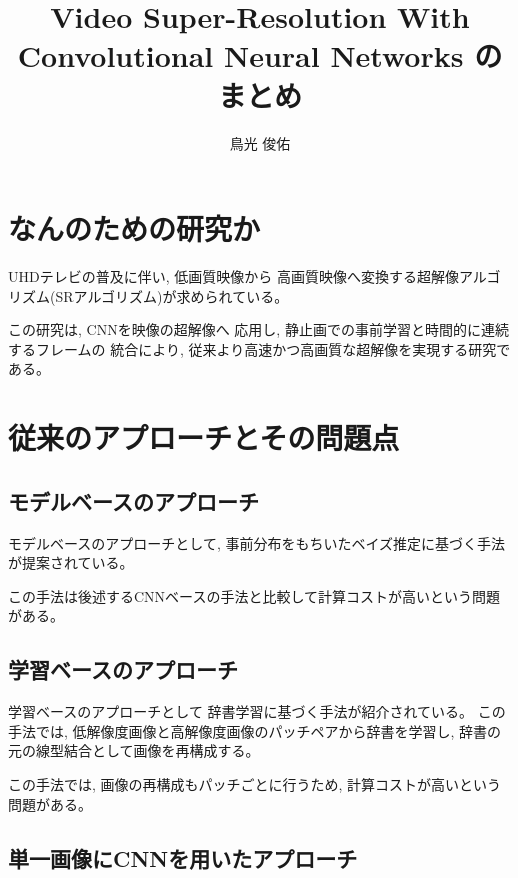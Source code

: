 \documentclass[dvipdfmx,a4j,10pt, twocolumn]{jsarticle}
\begin{document}

\newpage 

\title{Video Super-Resolution With Convolutional Neural Networks\cite{7444187} のまとめ}
\author{鳥光 俊佑}
\maketitle



\setlength{\columnseprule}{0.4pt} %





\section*{なんのための研究か}

UHDテレビの普及に伴い, 低画質映像から
高画質映像へ変換する超解像アルゴリズム(SRアルゴリズム)が求められている。

この研究は, CNNを映像の超解像へ
応用し, 静止画での事前学習と時間的に連続するフレームの
統合により, 従来より高速かつ高画質な超解像を実現する研究である。

\section*{従来のアプローチとその問題点}

\subsection*{モデルベースのアプローチ}
モデルベースのアプローチとして, 
事前分布をもちいたベイズ推定に基づく手法が提案されている。

この手法は後述するCNNベースの手法と比較して計算コストが高いという問題がある。

\subsection*{学習ベースのアプローチ}

学習ベースのアプローチとして
辞書学習に基づく手法が紹介されている。
この手法では, 低解像度画像と高解像度画像のパッチペアから辞書を学習し, 
辞書の元の線型結合として画像を再構成する。

この手法では, 画像の再構成もパッチごとに行うため, 計算コストが高いという問題がある。

\subsection*{単一画像にCNNを用いたアプローチ}
\end{document}
